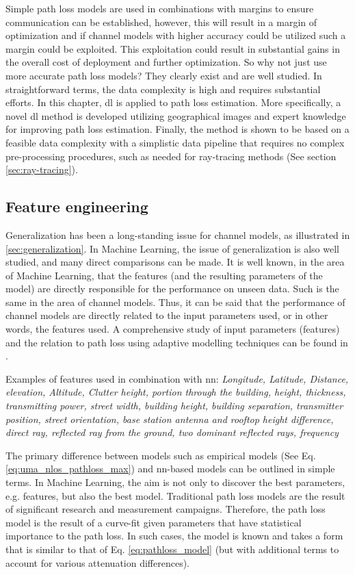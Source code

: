 Simple path loss models are used in combinations with margins to ensure communication can be established, however, this will result in a margin of optimization and if channel models with higher accuracy could be utilized such a margin could be exploited. This exploitation could result in substantial gains in the overall cost of deployment and further optimization. So why not just use more accurate path loss models? They clearly exist and are well studied. In straightforward terms, the data complexity is high and requires substantial efforts. In this chapter, \gls{dl} is applied to path loss estimation. More specifically, a novel \gls{dl} method is developed utilizing geographical images and expert knowledge for improving path loss estimation. Finally, the method is shown to be based on a feasible data complexity with a simplistic data pipeline that requires no complex pre-processing procedures, such as needed for ray-tracing methods (See section \ref{sec:ray-tracing}).

\subsection{Feature engineering}

Generalization has been a long-standing issue for channel models, as illustrated in \ref{sec:generalization}. In Machine Learning, the issue of generalization is also well studied, and many direct comparisons can be made. It is well known, in the area of Machine Learning, that the features (and the resulting parameters of the model) are directly responsible for the performance on unseen data.  Such is the same in the area of channel models. Thus, it can be said that the performance of channel models are directly related to the input parameters used, or in other words, the features used. A comprehensive study of input parameters (features) and the relation to path loss using adaptive modelling techniques can be found in \cite{Popoola2019}. 
 
Examples of features used in combination with \gls{nn}: \emph{Longitude, Latitude, Distance, elevation, Altitude, Clutter height, portion through the building, height, thickness, transmitting power, street width, building height, building separation, transmitter position, street orientation, base station antenna and rooftop height difference, direct ray, reflected ray from the ground, two dominant reflected rays, frequency}

The primary difference between models such as empirical models (See Eq. \ref{eq:uma_nlos_pathloss_max}) and \gls{nn}-based models can be outlined in simple terms. In Machine Learning, the aim is not only to discover the best parameters, e.g. features, but also the best model. Traditional path loss models are the result of significant research and measurement campaigns. Therefore, the path loss model is the result of a curve-fit given parameters that have statistical importance to the path loss. In such cases, the model is known and takes a form that is similar to that of Eq. \ref{eq:pathloss_model} (but with additional terms to account for various attenuation differences).

